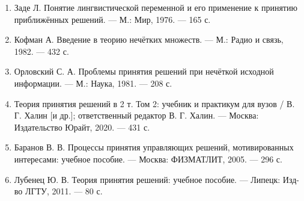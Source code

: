 \begin{enumerate}
    \item Заде Л. Понятие лингвистической переменной и его применение к принятию приближённых решений. --- М.: Мир, 1976. --- 165 с.
    \item Кофман А. Введение в теорию нечётких множеств. --- М.: Радио и связь, 1982. --- 432 с.
    \item Орловский С. А. Проблемы принятия решений при нечёткой исходной информации. --- М.: Наука, 1981. --- 208 с.
    \item Теория принятия решений в 2 т. Том 2: учебник и практикум для вузов / В. Г. Халин [и др.]; ответственный редактор В. Г. Халин. --- Москва: Издательство Юрайт, 2020. --- 431 с.
    \item Баранов В. В. Процессы принятия управляющих решений, мотивированных интересами: учебное пособие. --- Москва: ФИЗМАТЛИТ, 2005. --- 296 с.
    \item Лубенец Ю. В. Теория принятия решений: учебное пособие. --- Липецк: Изд-во ЛГТУ, 2011. --- 80 с.
\end{enumerate}
